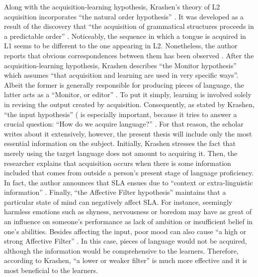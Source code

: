 \documentclass{article}
\begin{document}
Along with the acquisition-learning hypothesis, Krashen’s theory of L2 acquisition incorporates “the natural order hypothesis” \cite{krashen_principles_1982}. It was developed as a result of the discovery that “the acquisition of grammatical structures proceeds in a predictable order” \cite{krashen_principles_1982}. Noticeably, the sequence in which a tongue is acquired in L1 seems to be different to the one appearing in L2. Nonetheless, the author reports that obvious correspondences between them has been observed \cite{krashen_principles_1982}.
After the acquisition-learning hypothesis, Krashen describes “the Monitor hypothesis” \cite{krashen_principles_1982} which assumes “that acquisition and learning are used in very specific ways”. Albeit the former is generally responsible for producing pieces of language, the latter acts as a “Monitor, or editor” \cite{krashen_principles_1982}. To put it simply, learning is involved solely in revising the output created by acquisition.
Consequently, as stated by Krashen, “the input hypothesis” (\cite{krashen_principles_1982} is especially important, because it tries to answer a crucial question: “How do we acquire language?” \cite{krashen_principles_1982}. For that reason, the scholar writes about it extensively, however, the present thesis will include only the most essential information on the subject. Initially, Krashen stresses the fact that merely using the target language does not amount to acquiring it. Then, the researcher explains that acquisition occurs when there is some information included that comes from outside a person’s present stage of language proficiency. In fact, the author announces that SLA ensues due to “context or extra-linguistic information” \cite{krashen_principles_1982}.
Finally, “the Affective Filter hypothesis” \cite{krashen_principles_1982} maintains that a particular state of mind can negatively affect SLA. For instance, seemingly harmless emotions such as shyness, nervousness or boredom may have as great of an influence on someone’s performance as lack of ambition or insufficient belief in one’s abilities. Besides affecting the input, poor mood can also cause “a high or strong Affective Filter” \cite{krashen_principles_1982}. In this case, pieces of language would not be acquired, although the information would be comprehensive to the learners. Therefore, according to Krashen, “a lower or weaker filter” \cite{krashen_principles_1982} is much more effective and it is most beneficial to the learners. 
\end{document}
